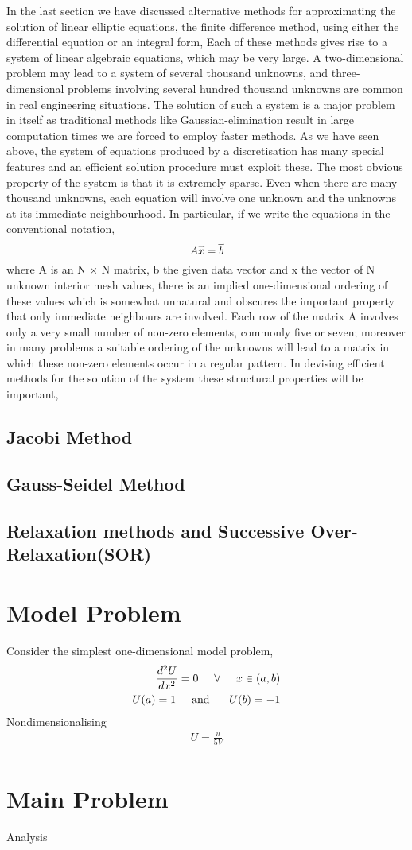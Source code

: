 \documentclass[a4paper,12pt]{article}
\numberwithin{equation}{section}
\newcommand{\gs}{\hspace{0.5cm}}
\newcommand{\mvec}[1]{\accentset{\rightharpoonup}{#1}}
\begin{document}
In the last section we have discussed alternative methods for approximating
the solution of linear elliptic equations, the ﬁnite diﬀerence method, using
either the diﬀerential equation or an integral form, Each of these methods gives rise to a system of linear algebraic equations, which may be very large. A two-dimensional problem may lead to a system of several thousand unknowns, and three-dimensional problems involving several hundred thousand unknowns are common in real engineering situations. The solution of such a system is a major problem in itself as traditional methods like Gaussian-elimination result in large computation times we are forced to employ faster methods. As we have seen above, the system of equations produced by a discretisation has many special features and an eﬃcient solution procedure must exploit these. The most obvious property of the system is that it is extremely sparse. Even when there are many thousand unknowns, each equation will involve one unknown and the unknowns at its immediate neighbourhood. In particular, if we write the equations in the conventional notation,
\begin{equation*}
    A \mvec{x} = \mvec{b} 
\end{equation*}
where A is an N × N matrix, b the given data vector and x the vector
of N unknown interior mesh values, there is an implied one-dimensional
ordering of these values which is somewhat unnatural and obscures the
important property that only immediate neighbours are involved. Each
row of the matrix A involves only a very small number of non-zero
elements, commonly ﬁve or seven; moreover in many problems a suitable
ordering of the unknowns will lead to a matrix in which these non-zero
elements occur in a regular pattern. In devising eﬃcient methods for
the solution of the system these structural properties will be important,

\subsection{Jacobi Method}
\subsection{Gauss-Seidel Method}
\subsection{Relaxation methods and Successive Over-Relaxation(SOR)}
\section{Model Problem}
Consider the simplest one-dimensional model problem,
\begin{align}
    \frac{d^2U }{dx^2} = 0 \gs \forall \gs x \in (a,b) \\
    U(a) = 1 \text{\gs and \gs } U(b) = -1 \nonumber
\end{align}
Nondimensionalising 
\begin{align}
    U = \frac{u}{5V} \\
\end{align}

\section{Main Problem}
Analysis  
\end{document}
